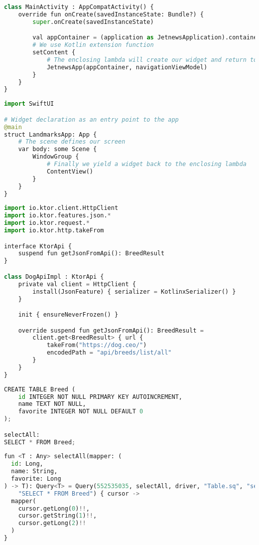 \begin{lstlisting}[style=light, language=Python,label={lst:android_jetpack_compose},caption=Android Jetpack Compose]
class MainActivity : AppCompatActivity() {
    override fun onCreate(savedInstanceState: Bundle?) {
        super.onCreate(savedInstanceState)

        val appContainer = (application as JetnewsApplication).container
        # We use Kotlin extension function
        setContent {
            # The enclosing lambda will create our widget and return to the app
            JetnewsApp(appContainer, navigationViewModel)
        }
    }
}
\end{lstlisting}

\begin{lstlisting}[style=light, language=Python,label={lst:ios_swift_ui},caption=Swift UI]
import SwiftUI

# Widget declaration as an entry point to the app
@main
struct LandmarksApp: App {
    # The scene defines our screen
    var body: some Scene {
        WindowGroup {
            # Finally we yield a widget back to the enclosing lambda
            ContentView()
        }
    }
}
\end{lstlisting}

\begin{lstlisting}[style=light, language=Python,label={lst:kmm_ktor},caption=Ktor]
import io.ktor.client.HttpClient
import io.ktor.features.json.*
import io.ktor.request.*
import io.ktor.http.takeFrom

interface KtorApi {
    suspend fun getJsonFromApi(): BreedResult
}

class DogApiImpl : KtorApi {
    private val client = HttpClient {
        install(JsonFeature) { serializer = KotlinxSerializer() }
    }

    init { ensureNeverFrozen() }

    override suspend fun getJsonFromApi(): BreedResult =
        client.get<BreedResult> { url {
            takeFrom("https://dog.ceo/")
            encodedPath = "api/breeds/list/all"
        }
    }
}
\end{lstlisting}

\begin{lstlisting}[style=light, language=Python,label={lst:table_sq},caption=Table.sq]
CREATE TABLE Breed (
    id INTEGER NOT NULL PRIMARY KEY AUTOINCREMENT,
    name TEXT NOT NULL,
    favorite INTEGER NOT NULL DEFAULT 0
);

selectAll:
SELECT * FROM Breed;
\end{lstlisting}

\begin{lstlisting}[style=light, language=Python,label={lst:table_sq_gen},caption=Generate code]
fun <T : Any> selectAll(mapper: (
  id: Long,
  name: String,
  favorite: Long
) -> T): Query<T> = Query(552535035, selectAll, driver, "Table.sq", "selectAll",
    "SELECT * FROM Breed") { cursor ->
  mapper(
    cursor.getLong(0)!!,
    cursor.getString(1)!!,
    cursor.getLong(2)!!
  )
}
\end{lstlisting}
